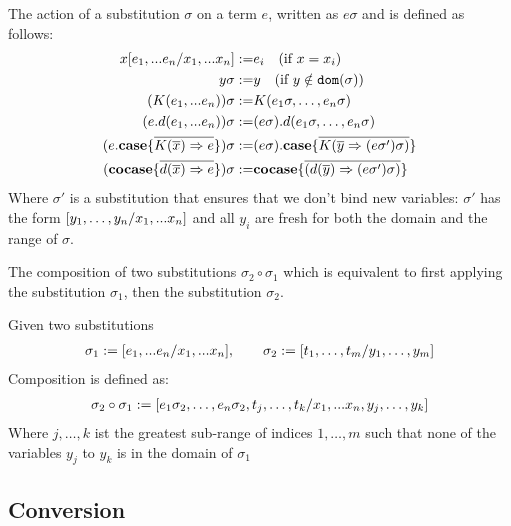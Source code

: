 \documentclass[twoside,12pt,a4paper]{article}
\begin{document}
\begin{definition}
    The action of a substitution $\sigma$ on a term $e$, written as $e \sigma$ and is defined as follows:
    \begin{align*}
        x[e_1,...e_n / x_1,...x_n] :=& e_i \quad(\text{if } x=x_i) \\
        y\sigma :=& y\quad (\text{if }y\notin \texttt{dom}(\sigma))\\
        (K(e_1,...e_n))\sigma :=& K(e_1 \sigma,\dots , e_n \sigma)\\
        (e.d(e_1,...e_n)) \sigma:=& (e \sigma).d(e_1 \sigma,\dots , e_n \sigma)\\
        (e.\textbf{case}\{\overline{K(\overline{x})\Rightarrow e}\})\sigma:=& (e\sigma).\textbf{case}\{\overline{K(\overline{y}\Rightarrow (e\sigma')\sigma)}\}\\
        (\textbf{cocase}\{\overline{d(\overline{x})\Rightarrow e}\})\sigma:=& \textbf{cocase}\{\overline{(d(\overline{y})\Rightarrow(e\sigma')\sigma)}\}
    \end{align*} 
    Where $\sigma'$ is a substitution that ensures that we don't bind new variables: 
    $\sigma'$ has the form $[y_1,\dots, y_n/x_1,...x_n]$ and all $y_i$ are fresh for both the domain and the range of $\sigma$.
\end{definition}

The composition of two substitutions $\sigma_2 \circ \sigma_1$ which is equivalent to first applying the substitution $\sigma_1$, then the substitution $\sigma_2$.

\begin{definition}
    Given two substitutions
    \begin{align*}
        \sigma_1 := [e_1,...e_n/x_1,...x_n],\qquad \sigma_2 := [t_1,\dots,t_m/y_1,\dots,y_m]
    \end{align*}
    Composition is defined as:
    \begin{align*}
        \sigma_2\circ\sigma_1 := [e_1\sigma_2,\dots,e_n\sigma_2,t_j,\dots,t_k/x_1,...x_n,y_j,\dots,y_k]
    \end{align*}
    Where $j, \dots, k$ ist the greatest sub-range of indices $1,\dots,m$ such that none of the variables $y_j$ to $y_k$ is in the domain of $\sigma_1$ 
\end{definition}

\subsection{Conversion}
\end{document}
